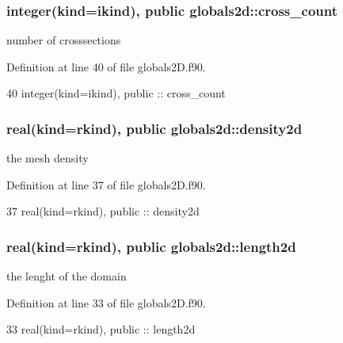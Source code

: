 \subsubsection[{cross\+\_\+count}]{\setlength{\rightskip}{0pt plus 5cm}integer(kind=ikind), public globals2d\+::cross\+\_\+count}\label{namespaceglobals2d_a2779511ac01046530e2d96ef31a3bec0}


number of crosssections 



Definition at line 40 of file globals2\+D.\+f90.


\begin{DoxyCode}
40   \textcolor{keywordtype}{integer(kind=ikind)}, \textcolor{keywordtype}{public} :: cross_count
\end{DoxyCode}
\subsubsection[{density2d}]{\setlength{\rightskip}{0pt plus 5cm}real(kind=rkind), public globals2d\+::density2d}\label{namespaceglobals2d_aa5475589df29fcf108cec88a0be56110}


the mesh density 



Definition at line 37 of file globals2\+D.\+f90.


\begin{DoxyCode}
37   \textcolor{keywordtype}{real(kind=rkind)}, \textcolor{keywordtype}{public} :: density2d 
\end{DoxyCode}
\subsubsection[{length2d}]{\setlength{\rightskip}{0pt plus 5cm}real(kind=rkind), public globals2d\+::length2d}\label{namespaceglobals2d_a2419a25245602019ee00305136adeebf}


the lenght of the domain 



Definition at line 33 of file globals2\+D.\+f90.


\begin{DoxyCode}
33   \textcolor{keywordtype}{real(kind=rkind)}, \textcolor{keywordtype}{public} :: length2d
\end{DoxyCode}
